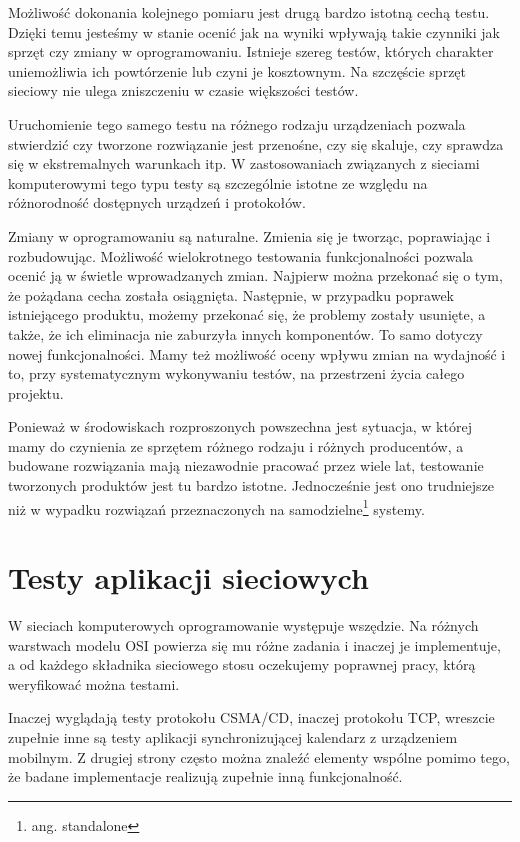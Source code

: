 \documentclass[00-praca-magisterska.tex]{subfiles}
\begin{document}
Możliwość dokonania kolejnego pomiaru jest drugą bardzo istotną cechą testu.
Dzięki temu jesteśmy w stanie ocenić jak na wyniki wpływają takie czynniki jak
sprzęt czy zmiany w oprogramowaniu. Istnieje szereg testów, których charakter
uniemożliwia ich powtórzenie lub czyni je kosztownym. Na szczęście sprzęt
sieciowy nie ulega zniszczeniu w czasie większości testów.

Uruchomienie tego samego testu na różnego rodzaju urządzeniach pozwala
stwierdzić czy tworzone rozwiązanie jest przenośne, czy się skaluje, czy
sprawdza się w ekstremalnych warunkach itp. W zastosowaniach związanych z
sieciami komputerowymi tego typu testy są szczególnie istotne ze względu na
różnorodność dostępnych urządzeń i protokołów.

Zmiany w oprogramowaniu są naturalne. Zmienia się je tworząc, poprawiając i
rozbudowując. Możliwość wielokrotnego testowania funkcjonalności pozwala ocenić
ją w świetle wprowadzanych zmian. Najpierw można przekonać się o tym, że
pożądana cecha została osiągnięta. Następnie, w przypadku poprawek istniejącego
produktu, możemy przekonać się, że problemy zostały usunięte, a także, że ich
eliminacja nie zaburzyła innych komponentów. To samo dotyczy nowej
funkcjonalności. Mamy też możliwość oceny wpływu zmian na wydajność i to, przy
systematycznym wykonywaniu testów, na przestrzeni życia całego projektu.

Ponieważ w środowiskach rozproszonych powszechna jest sytuacja, w której mamy
do czynienia ze sprzętem różnego rodzaju i różnych producentów, a budowane
rozwiązania mają niezawodnie pracować przez wiele lat, testowanie tworzonych
produktów jest tu bardzo istotne. Jednocześnie jest ono trudniejsze niż w
wypadku rozwiązań przeznaczonych na samodzielne\footnote{ang. standalone}
systemy.

\section{Testy aplikacji sieciowych}

W sieciach komputerowych oprogramowanie występuje wszędzie. Na różnych
warstwach modelu OSI powierza się mu różne zadania i inaczej je implementuje, a
od każdego składnika sieciowego stosu oczekujemy poprawnej pracy, którą
weryfikować można testami.

Inaczej wyglądają testy protokołu CSMA/CD, inaczej protokołu TCP, wreszcie
zupełnie inne są testy aplikacji synchronizującej kalendarz z urządzeniem
mobilnym. Z drugiej strony często można znaleźć elementy wspólne pomimo tego,
że badane implementacje realizują zupełnie inną funkcjonalność.
\end{document}
